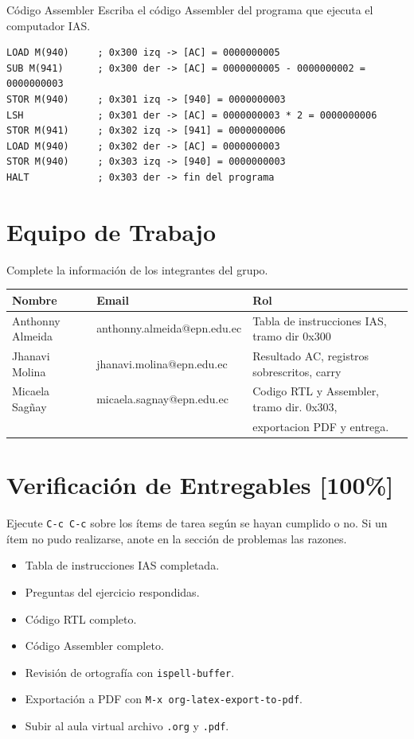 \documentclass{article}
\begin{document}
\begin{frame}[label={sec:org5424507},fragile]{Código Assembler}
 Escriba el código Assembler del programa que ejecuta el computador IAS.

\begin{verbatim}
LOAD M(940)     ; 0x300 izq -> [AC] = 0000000005
SUB M(941)      ; 0x300 der -> [AC] = 0000000005 - 0000000002 = 0000000003
STOR M(940)     ; 0x301 izq -> [940] = 0000000003
LSH             ; 0x301 der -> [AC] = 0000000003 * 2 = 0000000006
STOR M(941)     ; 0x302 izq -> [941] = 0000000006
LOAD M(940)     ; 0x302 der -> [AC] = 0000000003
STOR M(940)     ; 0x303 izq -> [940] = 0000000003
HALT            ; 0x303 der -> fin del programa
\end{verbatim}
\end{frame}

\section{Equipo de Trabajo}
\label{sec:org6b5f31d}

Complete la información de los integrantes del grupo.

\begin{center}
\begin{tabular}{lll}
\hline
Nombre & Email & Rol\\[0pt]
\hline
Anthonny Almeida & anthonny.almeida@epn.edu.ec & Tabla de instrucciones IAS, tramo dir 0x300\\[0pt]
Jhanavi Molina & jhanavi.molina@epn.edu.ec & Resultado AC, registros sobrescritos, carry\\[0pt]
Micaela Sagñay & micaela.sagnay@epn.edu.ec & Codigo RTL y Assembler, tramo dir. 0x303,\\[0pt]
 &  & exportacion PDF y entrega.\\[0pt]
\hline
\end{tabular}
\end{center}

\section{Verificación de Entregables [100\%]}
\label{sec:org744101d}

Ejecute \texttt{C-c C-c} sobre los ítems de tarea según se hayan cumplido o
no. Si un ítem no pudo realizarse, anote en la sección de problemas
las razones.

\begin{itemize}
\item[{$\boxtimes$}] Tabla de instrucciones IAS completada.
\item[{$\boxtimes$}] Preguntas del ejercicio respondidas.
\item[{$\boxtimes$}] Código RTL completo.
\item[{$\boxtimes$}] Código Assembler completo.
\item[{$\boxtimes$}] Revisión de ortografía con \texttt{ispell-buffer}.
\item[{$\boxtimes$}] Exportación a PDF con \texttt{M-x org-latex-export-to-pdf}.
\item[{$\boxtimes$}] Subir al aula virtual archivo \texttt{.org} y \texttt{.pdf}.
\end{itemize}
\end{document}
